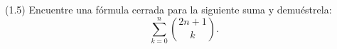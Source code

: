 
(1.5) Encuentre una fórmula cerrada para la siguiente suma y demuéstrela:
\[
  \sum_{k=0}^{n} \binom{2n+1}{k}.
\]
